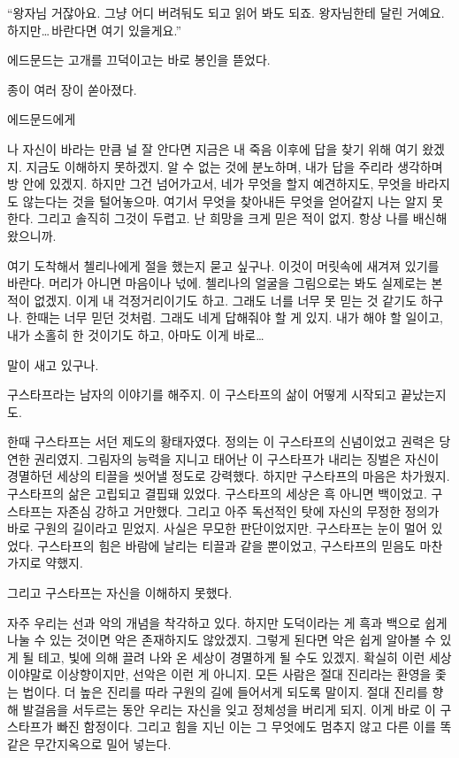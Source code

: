 ``왕자님 거잖아요. 그냥 어디 버려둬도 되고 읽어 봐도 되죠. 왕자님한테 달린 거예요. 하지만\ldots\,바란다면 여기 있을게요.''

에드문드는 고개를 끄덕이고는 바로 봉인을 뜯었다.

종이 여러 장이 쏟아졌다.\begin{letter}

에드문드에게

나 자신이 바라는 만큼 널 잘 안다면 지금은 내 죽음 이후에 답을 찾기 위해 여기 왔겠지. 지금도 이해하지 못하겠지. 알 수 없는 것에 분노하며, 내가 답을 주리라 생각하며 방 안에 있겠지. 하지만 그건 넘어가고서, 네가 무엇을 할지 예견하지도, 무엇을 바라지도 않는다는 것을 털어놓으마. 여기서 무엇을 찾아내든 무엇을 얻어갈지 나는 알지 못한다. 그리고 솔직히 그것이 두렵고. 난 희망을 크게 믿은 적이 없지. 항상 나를 배신해 왔으니까.

여기 도착해서 첼리나에게 절을 했는지 묻고 싶구나. 이것이 머릿속에 새겨져 있기를 바란다. 머리가 아니면 마음이나 넋에. 첼리나의 얼굴을 그림으로는 봐도 실제로는 본 적이 없겠지. 이게 내 걱정거리이기도 하고. 그래도 너를 너무 못 믿는 것 같기도 하구나. 한때는 너무 믿던 것처럼. 그래도 네게 답해줘야 할 게 있지. 내가 해야 할 일이고, 내가 소홀히 한 것이기도 하고, 아마도 이게 바로\ldots

말이 새고 있구나.

구스타프라는 남자의 이야기를 해주지. 이 구스타프의 삶이 어떻게 시작되고 끝났는지도.

한때 구스타프는 서던 제도의 황태자였다. 정의는 이 구스타프의 신념이었고 권력은 당연한 권리였지. 그림자의 능력을 지니고 태어난 이 구스타프가 내리는 징벌은 자신이 경멸하던 세상의 티끌을 씻어낼 정도로 강력했다. 하지만 구스타프의 마음은 차가웠지. 구스타프의 삶은 고립되고 결핍돼 있었다. 구스타프의 세상은 흑 아니면 백이었고. 구스타프는 자존심 강하고 거만했다. 그리고 아주 독선적인 탓에 자신의 무정한 정의가 바로 구원의 길이라고 믿었지. 사실은 무모한 판단이었지만. 구스타프는 눈이 멀어 있었다. 구스타프의 힘은 바람에 날리는 티끌과 같을 뿐이었고, 구스타프의 믿음도 마찬가지로 약했지.

그리고 구스타프는 자신을 이해하지 못했다.

자주 우리는 선과 악의 개념을 착각하고 있다. 하지만 도덕이라는 게 흑과 백으로 쉽게 나눌 수 있는 것이면 악은 존재하지도 않았겠지. 그렇게 된다면 악은 쉽게 알아볼 수 있게 될 테고, 빛에 의해 끌려 나와 온 세상이 경멸하게 될 수도 있겠지. 확실히 이런 세상이야말로 이상향이지만, 선악은 이런 게 아니지. 모든 사람은 절대 진리라는 환영을 좇는 법이다. 더 높은 진리를 따라 구원의 길에 들어서게 되도록 말이지. 절대 진리를 향해 발걸음을 서두르는 동안 우리는 자신을 잊고 정체성을 버리게 되지. 이게 바로 이 구스타프가 빠진 함정이다. 그리고 힘을 지닌 이는 그 무엇에도 멈추지 않고 다른 이를 똑같은 무간지옥으로 밀어 넣는다.


\end{letter}
